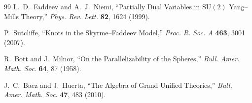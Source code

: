 \documentclass[aps,prl,preprint,superscriptaddress,floatfix]{revtex4-2}
\begin{document}
\begin{thebibliography}{99}
L.~D.~Faddeev and A.~J.~Niemi,
``Partially Dual Variables in $\mathrm{SU}(2)$ Yang--Mills Theory,''
\textit{Phys. Rev. Lett.} \textbf{82}, 1624 (1999).

P.~Sutcliffe,
``Knots in the Skyrme--Faddeev Model,''
\textit{Proc. R. Soc. A} \textbf{463}, 3001 (2007).

R.~Bott and J.~Milnor,
``On the Parallelizability of the Spheres,''
\textit{Bull. Amer. Math. Soc.} \textbf{64}, 87 (1958).

J.~C.~Baez and J.~Huerta,
``The Algebra of Grand Unified Theories,''
\textit{Bull. Amer. Math. Soc.} \textbf{47}, 483 (2010).

\end{thebibliography}
\end{document}
